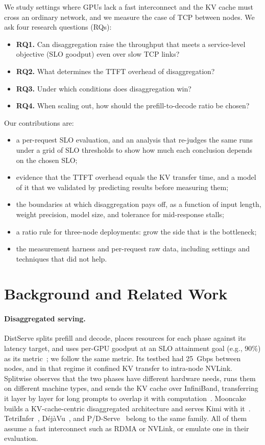 \documentclass[11pt]{article}
\begin{document}
We study settings where GPUs lack a fast interconnect and the KV cache must cross an ordinary network, and we measure the case of TCP between nodes. We ask four research questions (RQs):
\begin{itemize}
  \item \textbf{RQ1.} Can disaggregation raise the throughput that meets a service-level objective (SLO goodput) even over slow TCP links?
  \item \textbf{RQ2.} What determines the TTFT overhead of disaggregation?
  \item \textbf{RQ3.} Under which conditions does disaggregation win?
  \item \textbf{RQ4.} When scaling out, how should the prefill-to-decode ratio be chosen?
\end{itemize}
Our contributions are:
\begin{itemize}
  \item a per-request SLO evaluation, and an analysis that re-judges the same runs under a grid of SLO thresholds to show how much each conclusion depends on the chosen SLO;
  \item evidence that the TTFT overhead equals the KV transfer time, and a model of it that we validated by predicting results before measuring them;
  \item the boundaries at which disaggregation pays off, as a function of input length, weight precision, model size, and tolerance for mid-response stalls;
  \item a ratio rule for three-node deployments: grow the side that is the bottleneck;
  \item the measurement harness and per-request raw data, including settings and techniques that did not help.
\end{itemize}

\section{Background and Related Work}

\paragraph{Disaggregated serving.} DistServe splits prefill and decode, places resources for each phase against its latency target, and uses per-GPU goodput at an SLO attainment goal (e.g., 90\%) as its metric~\cite{distserve}; we follow the same metric. Its testbed had 25~Gbps between nodes, and in that regime it confined KV transfer to intra-node NVLink. Splitwise observes that the two phases have different hardware needs, runs them on different machine types, and sends the KV cache over InfiniBand, transferring it layer by layer for long prompts to overlap it with computation~\cite{splitwise}. Mooncake builds a KV-cache-centric disaggregated architecture and serves Kimi with it~\cite{mooncake}. TetriInfer~\cite{tetriinfer}, D\'ej\`aVu~\cite{dejavu}, and P/D-Serve~\cite{pdserve} belong to the same family. All of them assume a fast interconnect such as RDMA or NVLink, or emulate one in their evaluation.
\end{document}
